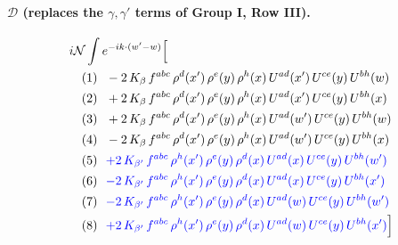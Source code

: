 \documentclass[10pt]{article}
\numberwithin{equation}{section}
\newcommand{\NN}{\mathcal N}
\begin{document}
\paragraph{$\mathcal D$ (replaces the $\gamma,\gamma'$ terms of Group I, Row III).}
\begin{align*}
&i\NN\int e^{-ik\cdot(w'-w)}\Big[\\
&\quad\text{(1)}\ \ -2\,K_{\beta}\,f^{abc}\,\rho^{d}(x')\,\rho^{e}(y)\,\rho^{h}(x)\,U^{ad}(x')\,U^{ce}(y)\,U^{bh}(w)\\
&\quad\text{(2)}\ \ +2\,K_{\beta}\,f^{abc}\,\rho^{d}(x')\,\rho^{e}(y)\,\rho^{h}(x)\,U^{ad}(x')\,U^{ce}(y)\,U^{bh}(x)\\
&\quad\text{(3)}\ \ +2\,K_{\beta}\,f^{abc}\,\rho^{d}(x')\,\rho^{e}(y)\,\rho^{h}(x)\,U^{ad}(w')\,U^{ce}(y)\,U^{bh}(w)\\
&\quad\text{(4)}\ \ -2\,K_{\beta}\,f^{abc}\,\rho^{d}(x')\,\rho^{e}(y)\,\rho^{h}(x)\,U^{ad}(w')\,U^{ce}(y)\,U^{bh}(x)\\
&\quad\text{(5)}\ \ \textcolor{blue}{+2\,K_{\beta'}\,f^{abc}\,\rho^{h}(x')\,\rho^{e}(y)\,\rho^{d}(x)\,U^{ad}(x)\,U^{ce}(y)\,U^{bh}(w')}\\
&\quad\text{(6)}\ \ \textcolor{blue}{-2\,K_{\beta'}\,f^{abc}\,\rho^{h}(x')\,\rho^{e}(y)\,\rho^{d}(x)\,U^{ad}(x)\,U^{ce}(y)\,U^{bh}(x')}\\
&\quad\text{(7)}\ \ \textcolor{blue}{-2\,K_{\beta'}\,f^{abc}\,\rho^{h}(x')\,\rho^{e}(y)\,\rho^{d}(x)\,U^{ad}(w)\,U^{ce}(y)\,U^{bh}(w')}\\
&\quad\text{(8)}\ \ \textcolor{blue}{+2\,K_{\beta'}\,f^{abc}\,\rho^{h}(x')\,\rho^{e}(y)\,\rho^{d}(x)\,U^{ad}(w)\,U^{ce}(y)\,U^{bh}(x')}\Big]
\end{align*}
\end{document}
